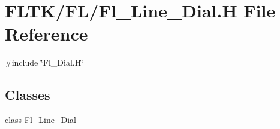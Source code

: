 \hypertarget{_fl___line___dial_8_h}{}\section{F\+L\+T\+K/\+F\+L/\+Fl\+\_\+\+Line\+\_\+\+Dial.H File Reference}
\label{_fl___line___dial_8_h}
{\ttfamily \#include \char`\"{}Fl\+\_\+\+Dial.\+H\char`\"{}}\newline
\subsection*{Classes}
\begin{DoxyCompactItemize}
\item 
class \hyperlink{class_fl___line___dial}{Fl\+\_\+\+Line\+\_\+\+Dial}
\end{DoxyCompactItemize}
